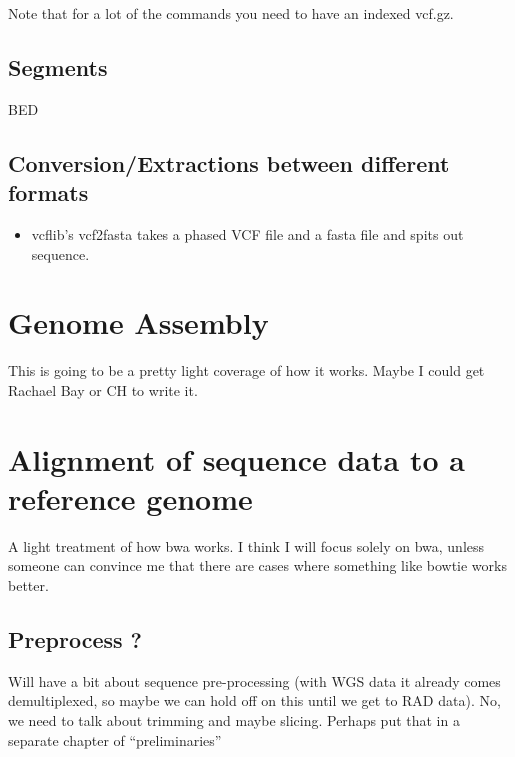 \documentclass[]{krantz}
\providecommand{\tightlist}{%
  \setlength{\itemsep}{0pt}\setlength{\parskip}{0pt}}
\begin{document}
Note that for a lot of the commands you need to have an indexed vcf.gz.

\hypertarget{segments}{%
\section{Segments}\label{segments}}

BED

\hypertarget{conversionextractions-between-different-formats}{%
\section{Conversion/Extractions between different formats}\label{conversionextractions-between-different-formats}}

\begin{itemize}
\tightlist
\item
  vcflib's vcf2fasta takes a phased VCF file and a fasta file and spits out sequence.
\end{itemize}

\hypertarget{genome-assembly}{%
\chapter{Genome Assembly}\label{genome-assembly}}

This is going to be a pretty light coverage of how it works. Maybe I could get Rachael
Bay or CH to write it.

\hypertarget{alignment-of-sequence-data-to-a-reference-genome}{%
\chapter{Alignment of sequence data to a reference genome}\label{alignment-of-sequence-data-to-a-reference-genome}}

A light treatment of how bwa works. I think I will focus solely on bwa, unless
someone can convince me that there are cases where something like bowtie works better.

\hypertarget{preprocess}{%
\section{Preprocess ?}\label{preprocess}}

Will have a bit about sequence pre-processing (with WGS data it already
comes demultiplexed, so maybe we can hold off on this until we get to
RAD data). No, we need to talk about trimming and maybe slicing. Perhaps
put that in a separate chapter of ``preliminaries''
\end{document}
